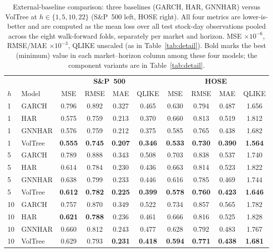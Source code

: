 \documentclass[runningheads,a4paper]{llncs}
\begin{document}
\begin{table}[!t]
\centering
\caption{External-baseline comparison: three baselines (GARCH, HAR, GNNHAR) versus VolTree at
$h\in\{1,5,10,22\}$ (S\&P~500 left, HOSE right). All four metrics are lower-is-better and are computed as
the mean loss over all test stock-day observations pooled across the eight walk-forward folds, separately
per market and horizon. MSE $\times10^{-6}$, RMSE/MAE $\times10^{-3}$, QLIKE unscaled (as in
Table~\ref{tab:detail}). Bold marks the best (minimum) value in each market--horizon column among these
four models; the component variants are in Table~\ref{tab:detail}.}
\label{tab:summary}
\scriptsize
\setlength{\tabcolsep}{3pt}
\begin{tabular}{ll cccc cccc}
\toprule
& & \multicolumn{4}{c}{\textbf{S\&P~500}} & \multicolumn{4}{c}{\textbf{HOSE}} \\
\cmidrule(lr){3-6}\cmidrule(lr){7-10}
$h$ & Model & MSE & RMSE & MAE & QLIKE & MSE & RMSE & MAE & QLIKE \\
\midrule
1 & GARCH    & 0.796 & 0.892 & 0.327 & 0.465 & 0.630 & 0.794 & 0.487 & 1.656 \\
1 & HAR      & 0.575 & 0.759 & 0.213 & 0.370 & 0.660 & 0.813 & 0.519 & 1.812 \\
1 & GNNHAR   & 0.576 & 0.759 & 0.212 & 0.375 & 0.585 & 0.765 & 0.438 & 1.682 \\
1 & VolTree & \textbf{0.555} & \textbf{0.745} & \textbf{0.207} & \textbf{0.346} & \textbf{0.533} & \textbf{0.730} & \textbf{0.390} & \textbf{1.564} \\
\midrule
5 & GARCH    & 0.789 & 0.888 & 0.343 & 0.508 & 0.703 & 0.838 & 0.537 & 1.740 \\
5 & HAR      & 0.614 & 0.784 & 0.230 & 0.436 & 0.663 & 0.814 & 0.523 & 1.822 \\
5 & GNNHAR   & 0.638 & 0.799 & 0.233 & 0.446 & 0.616 & 0.785 & 0.469 & 1.744 \\
5 & VolTree & \textbf{0.612} & \textbf{0.782} & \textbf{0.225} & \textbf{0.399} & \textbf{0.578} & \textbf{0.760} & \textbf{0.423} & \textbf{1.646} \\
\midrule
10 & GARCH    & 0.757 & 0.870 & 0.349 & 0.522 & 0.734 & 0.857 & 0.565 & 1.782 \\
10 & HAR      & \textbf{0.621} & \textbf{0.788} & 0.236 & 0.461 & 0.666 & 0.816 & 0.525 & 1.828 \\
10 & GNNHAR   & 0.660 & 0.812 & 0.243 & 0.477 & 0.628 & 0.792 & 0.483 & 1.767 \\
10 & VolTree & 0.629 & 0.793 & \textbf{0.231} & \textbf{0.418} & \textbf{0.594} & \textbf{0.771} & \textbf{0.438} & \textbf{1.681} \\

\end{tabular}
\end{table}
\end{document}

